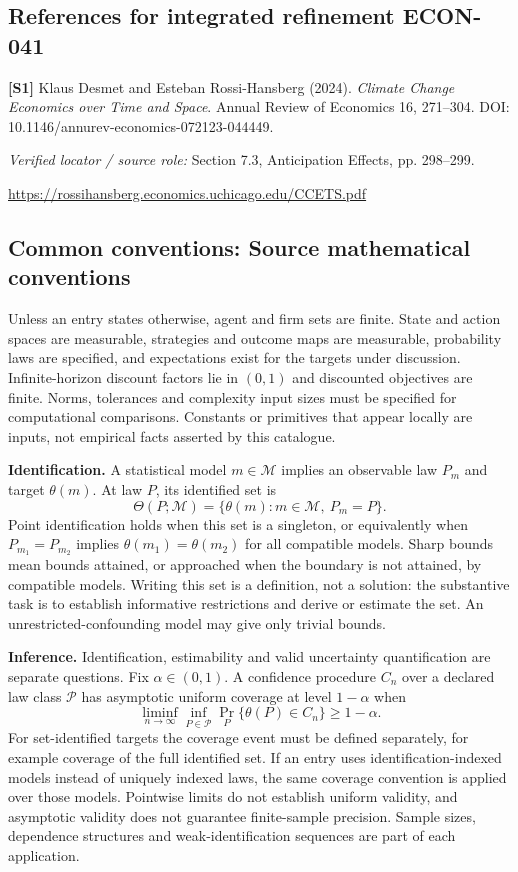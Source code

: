 \documentclass[11pt,a4paper]{article}
\begin{document}
\subsection*{References for integrated refinement ECON-041}
{\footnotesize\raggedright
\par\noindent\textbf{[S1]} Klaus Desmet and Esteban Rossi-Hansberg (2024). \emph{Climate Change Economics over Time and Space}. Annual Review of Economics 16, 271–304. DOI: 10.1146/annurev-economics-072123-044449.\par \textit{Verified locator / source role:} Section 7.3, Anticipation Effects, pp. 298–299.\par \url{https://rossihansberg.economics.uchicago.edu/CCETS.pdf}\par\smallskip
}

\subsection*{Common conventions: Source mathematical conventions}

Unless an entry states otherwise, agent and firm sets are finite. State and action spaces are measurable, strategies and outcome maps are measurable, probability laws are specified, and expectations exist for the targets under discussion. Infinite-horizon discount factors lie in $(0,1)$ and discounted objectives are finite. Norms, tolerances and complexity input sizes must be specified for computational comparisons. Constants or primitives that appear locally are inputs, not empirical facts asserted by this catalogue.

\textbf{Identification.} A statistical model $m\in\mathcal M$ implies an observable law $P_m$ and target $\theta(m)$. At law $P$, its identified set is
\[
\Theta(P;\mathcal M)=\{\theta(m):m\in\mathcal M,\ P_m=P\}.
\]
Point identification holds when this set is a singleton, or equivalently when $P_{m_1}=P_{m_2}$ implies $\theta(m_1)=\theta(m_2)$ for all compatible models. Sharp bounds mean bounds attained, or approached when the boundary is not attained, by compatible models. Writing this set is a definition, not a solution: the substantive task is to establish informative restrictions and derive or estimate the set. An unrestricted-confounding model may give only trivial bounds.

\textbf{Inference.} Identification, estimability and valid uncertainty quantification are separate questions. Fix $\alpha\in(0,1)$. A confidence procedure $C_n$ over a declared law class $\mathcal P$ has asymptotic uniform coverage at level $1-\alpha$ when
\[
\liminf_{n\to\infty}\inf_{P\in\mathcal P}\Pr_P\{\theta(P)\in C_n\}\geq1-\alpha.
\]
For set-identified targets the coverage event must be defined separately, for example coverage of the full identified set. If an entry uses identification-indexed models instead of uniquely indexed laws, the same coverage convention is applied over those models. Pointwise limits do not establish uniform validity, and asymptotic validity does not guarantee finite-sample precision. Sample sizes, dependence structures and weak-identification sequences are part of each application.
\end{document}
